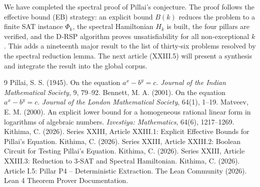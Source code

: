 \documentclass[11pt,a4paper]{article}
\begin{document}
We have completed the spectral proof of Pillai's conjecture. The proof follows the effective bound (EB) strategy: an explicit bound $B(k)$ reduces the problem to a finite SAT instance $\Phi_k$, the spectral Hamiltonian $H_k$ is built, the four pillars are verified, and the D‑RSP algorithm proves unsatisfiability for all non‑exceptional $k$. This adds a nineteenth major result to the list of thirty‑six problems resolved by the spectral reduction lemma. The next article (XXIII.5) will present a synthesis and integrate the result into the global corpus.


\begin{thebibliography}{9}
  Pillai, S. S. (1945). On the equation $a^x - b^y = c$. \emph{Journal of the Indian Mathematical Society}, 9, 79–92.
  Bennett, M. A. (2001). On the equation $a^x - b^y = c$. \emph{Journal of the London Mathematical Society}, 64(1), 1–19.
  Matveev, E. M. (2000). An explicit lower bound for a homogeneous rational linear form in logarithms of algebraic numbers. \emph{Izvestiya: Mathematics}, 64(6), 1217–1269.
  Kithima, C. (2026). Series XXIII, Article XXIII.1: Explicit Effective Bounds for Pillai's Equation.
  Kithima, C. (2026). Series XXIII, Article XXIII.2: Boolean Circuit for Testing Pillai's Equation.
  Kithima, C. (2026). Series XXIII, Article XXIII.3: Reduction to 3‑SAT and Spectral Hamiltonian.
  Kithima, C. (2026). Article I.5: Pillar P4 – Deterministic Extraction.
  The Lean Community (2026). Lean 4 Theorem Prover Documentation.
\end{thebibliography}
\end{document}
